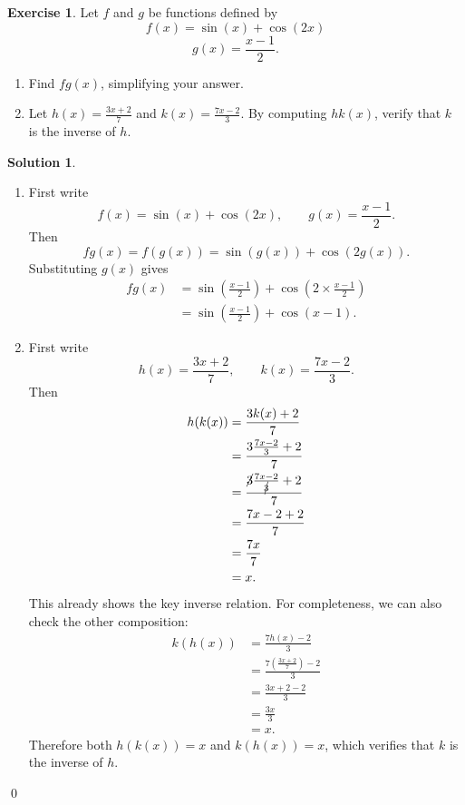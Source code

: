 \documentclass[a4paper]{article}
\theoremstyle{plain}
\theoremstyle{definition}
\newtheorem*{solution}{Solution}
\newtheorem{exercise}{Exercise}
\numberwithin{equation}{subsection}
\begin{document}

\begin{exercise}
Let $f$ and $g$ be functions defined by
\[
    f(x) = \sin(x) + \cos(2x)
\]
\[
    g(x) = \frac{x-1}{2}.
\]
\begin{enumerate}
    \item Find $fg(x)$, simplifying your answer.
    \item Let $h(x) = \frac{3x+2}{7}$ and $k(x) = \frac{7x-2}{3}$. By computing $hk(x)$, verify that $k$ is the inverse of $h$.
\end{enumerate}
\end{exercise}

\begin{solution}

\begin{enumerate}
    \item First write
    \[
        f(x) = \sin(x) + \cos(2x), \qquad g(x) = \frac{x-1}{2}.
    \]
    Then
    \[
        fg(x) = f(g(x)) = \sin(g(x)) + \cos(2g(x)).
    \]
    Substituting $g(x)$ gives
    \begin{align*}
        fg(x)
        &= \sin\left(\frac{x-1}{2}\right) + \cos\left(2\times\frac{x-1}{2}\right)\\
        &= \sin\left(\frac{x-1}{2}\right) + \cos(x-1).
    \end{align*}

    \item First write
    \[
        h(x) = \frac{3x+2}{7}, \qquad k(x) = \frac{7x-2}{3}.
    \]
    Then
    \begin{align*}
        h(k(x))
        &= \frac{3k(x)+2}{7}\\
        &= \frac{3\frac{7x-2}{3}+2}{7}\\
        &= \frac{\cancel{3}\frac{7x-2}{\cancel{3}}+2}{7}\\
        &= \frac{7x-2+2}{7}\\
        &= \frac{7x}{7}\\
        &= x.
    \end{align*}
    This already shows the key inverse relation. For completeness, we can also check the other composition:
    \begin{align*}
        k(h(x))
        &= \frac{7h(x)-2}{3}\\
        &= \frac{7\left(\frac{3x+2}{7}\right)-2}{3}\\
        &= \frac{3x+2-2}{3}\\
        &= \frac{3x}{3}\\
        &= x.
    \end{align*}
    Therefore both $h(k(x))=x$ and $k(h(x))=x$, which verifies that $k$ is the inverse of $h$.
\end{enumerate}
\qed
\end{solution}
\end{document}
